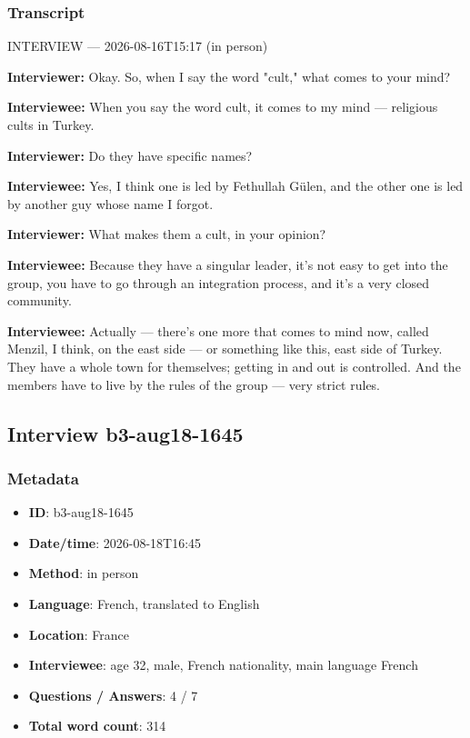 \subsubsection*{Transcript}
INTERVIEW — 2026-08-16T15:17 (in person)

\textbf{Interviewer:} Okay. So, when I say the word "cult," what comes to your mind?

\textbf{Interviewee:} When you say the word cult, it comes to my mind — religious cults in Turkey.

\textbf{Interviewer:} Do they have specific names?

\textbf{Interviewee:} Yes, I think one is led by Fethullah Gülen, and the other one is led by another guy whose name I forgot.


\textbf{Interviewer:} What makes them a cult, in your opinion?

\textbf{Interviewee:} Because they have a singular leader, it's not easy to get into the group, you have to go through an integration process, and it's a very closed community.

\textbf{Interviewee:} Actually — there's one more that comes to mind now, called Menzil, I think, on the east side — or something like this, east side of Turkey. They have a whole town for themselves; getting in and out is controlled. And the members have to live by the rules of the group — very strict rules.

\subsection{Interview b3-aug18-1645}\label{int:b3-aug18-1645}
\subsubsection*{Metadata}
\begin{itemize}
  \item \textbf{ID}: b3-aug18-1645
  \item \textbf{Date/time}: 2026-08-18T16:45
  \item \textbf{Method}: in person
  \item \textbf{Language}: French, translated to English
  \item \textbf{Location}: France
  \item \textbf{Interviewee}: age 32, male, French nationality, main language French
  \item \textbf{Questions / Answers}: 4 / 7
  \item \textbf{Total word count}: 314
\end{itemize}
